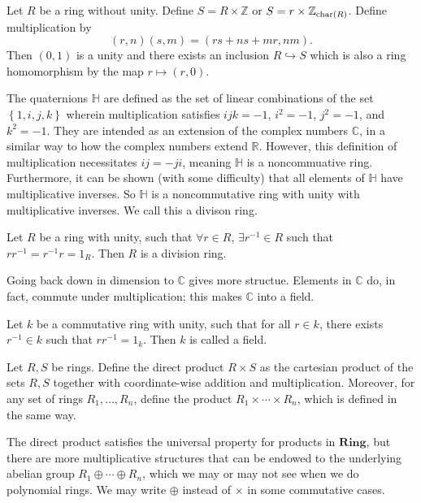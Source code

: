 
Let $R$ be a ring without unity. Define $S=R\times \mathbb{Z}$ or $S=r\times \mathbb{Z}_{\operatorname{char}(R) }$.  Define multiplication by
\[
	(r,n)(s,m)=(rs+ns+mr,nm)
.\]
Then $(0,1)$ is a unity and there exists an inclusion $R\hookrightarrow S$ which is also a ring homomorphism by the map $r\mapsto (r,0)$.

The quaternions $\mathbb{H}$ are defined as the set of linear combinations of the set $\left\{ 1,i,j,k \right\} $ wherein multiplication satisfies $ijk=-1$, $i^2=-1$, $j^2=-1$, and $k^2=-1$. They are intended as an extension of the complex numbers $\mathbb{C}$, in a similar way to how the complex numbers extend $\mathbb{R}$. However, this definition of multiplication necessitates $ij=-ji$, meaning $\mathbb{H}$ is a noncommuative ring. Furthermore, it can be shown (with some difficulty) that all elements of $\mathbb{H}$ have multiplicative inverses. So $\mathbb{H}$ is a noncommutative ring with unity with multiplicative inverses. We call this a divison ring.

\begin{definition}\label{dfn:1.4}
	Let $R$ be a ring with unity, such that  $\forall r\in R$, $\exists r^{-1}\in R$ such that $rr^{-1}=r^{-1}r=1_R$. Then $R$ is a division ring.
\end{definition}

Going back down in dimension to $\mathbb{C}$ gives more structue. Elements in $\mathbb{C}$ do, in fact, commute under multiplication; this makes $\mathbb{C}$ into a field.

\begin{definition}[Field]\label{dfn:1.5}
	Let $k$ be a commutative ring with unity, such that for all $r\in k$, there exists $r^{-1}\in k$ such that $rr^{-1}=1_k$. Then $k$ is called a field.
\end{definition}

\begin{definition}\label{dfn:1.6}
	Let $R,S$ be rings. Define the direct product $R\times S$ as the cartesian product of the sets $R,S$ together with coordinate-wise addition and multiplication. Moreover, for any set of rings $R_1, \dots, R_n $, define the product $R_1 \times \cdots \times R_n$, which is defined in the same way.
\end{definition}

The direct product satisfies the universal property for products in $\mathbf{Ring}$, but there are more multiplicative structures that can be endowed to the underlying abelian group $R_1 \oplus  \cdots \oplus  R_n $, which we may or may not see when we do polynomial rings. We may write $\oplus $ instead of $\times $ in some commutative cases.

